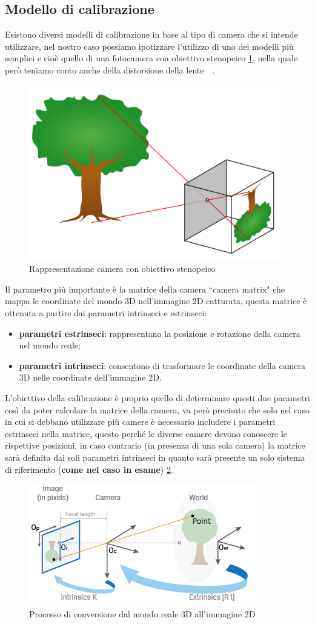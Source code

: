 \documentclass[12pt,a4paper,openright,twoside]{book}
\begin{document}
\subsection{Modello di calibrazione}
Esistono diversi modelli di calibrazione in base al tipo di camera che si intende utilizzare, nel nostro caso possiamo ipotizzare l'utilizzo di uno dei modelli più semplici e cioè quello di una fotocamera con obiettivo stenopeico \ref{fig:pinhole_camera}, nella quale però teniamo conto anche della distorsione della lente~\cite{pinholeCamera}~\cite{pinholeCameraModel}.
\begin{figure}[h!]
	\centering
	\includegraphics[width=0.5\linewidth]{./figures/Pinhole-camera.png}
	\caption{Rappresentazione camera con obiettivo stenopeico}
	\label{fig:pinhole_camera}
\end{figure}

Il parametro più importante è la matrice della camera ``camera matrix" che mappa le coordinate del mondo 3D nell'immagine 2D catturata, questa matrice è ottenuta a partire dai parametri intrinseci e estrinseci:
\begin{itemize}
	\item \textbf{parametri estrinseci}: rappresentano la posizione e rotazione della camera nel mondo reale;
	\item \textbf{parametri intrinseci}: consentono di trasformare le coordinate della camera 3D nelle coordinate dell'immagine 2D.
\end{itemize}
L'obiettivo della calibrazione è proprio quello di determinare questi due parametri così da poter calcolare la matrice della camera, va però precisato che solo nel caso in cui si debbano utilizzare più camere è necessario includere i parametri estrinseci nella matrice, questo perché le diverse camere devono conoscere le rispettive posizioni, in caso contrario (in presenza di una sola camera) la matrice sarà definita dai soli parametri intrinseci in quanto sarà presente un solo sistema di riferimento (\textbf{come nel caso in esame}) \ref{fig:calibration_cameramodel_coords}. 
\begin{figure}[h!]
	\centering
	\includegraphics[width=0.6\linewidth]{./figures/calibration-cameramodel-coords.png}
	\caption{Processo di conversione dal mondo reale 3D all'immagine 2D}
	\label{fig:calibration_cameramodel_coords}
\end{figure}
\end{document}
